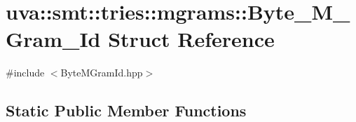 \hypertarget{structuva_1_1smt_1_1tries_1_1mgrams_1_1_byte___m___gram___id}{}\section{uva\+:\+:smt\+:\+:tries\+:\+:mgrams\+:\+:Byte\+\_\+\+M\+\_\+\+Gram\+\_\+\+Id Struct Reference}
\label{structuva_1_1smt_1_1tries_1_1mgrams_1_1_byte___m___gram___id}


{\ttfamily \#include $<$Byte\+M\+Gram\+Id.\+hpp$>$}

\subsection*{Static Public Member Functions}

